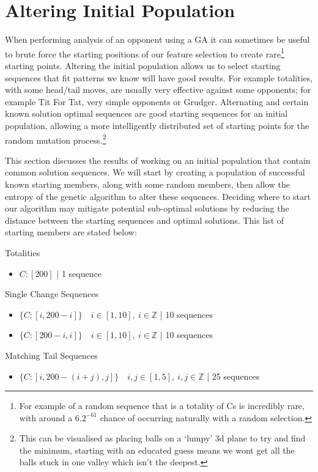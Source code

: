\section{Altering Initial Population}\label{sec:alteringinitialpopulation}
When performing analysis of an opponent using a GA it can sometimes be useful to brute force the starting positions of our feature selection to create rare\footnote{For example of a random sequence that is a totality of Cs is incredibly rare, with around a \(6.2^{-61}\) chance of occurring naturally with a random selection.} starting points.
Altering the initial population allows us to select starting sequences that fit patterns we know will have good results.
For example totalities, with some head/tail moves, are usually very effective against some opponents;
for example Tit For Tat, very simple opponents or Grudger.
Alternating and certain known solution optimal sequences are good starting sequences for an initial population, allowing a more intelligently distributed set of starting points for the random mutation process.\footnote{This can be visualised as placing balls on a `lumpy' 3d plane to try and find the minimum, starting with an educated guess means we wont get all the balls stuck in one valley which isn't the deepest.}

This section discusses the results of working on an initial population that contain common solution sequences.
We will start by creating a population of successful known starting members, along with some random members, then allow the entropy of the genetic algorithm to alter these sequences.
Deciding where to start our algorithm may mitigate potential sub-optimal solutions by reducing the distance between the starting sequences and optimal solutions.
This list of starting members are stated below:

Totalities
\begin{itemize}
    \item \(C:[200]\) | 1 sequence
\end{itemize}

Single Change Sequences
\begin{itemize}
    \item \(\{C:[i,200-i]\} \quad i\in [1,10],\ i \in \mathbb{Z}\) | 10 sequences
    \item \(\{C:[200-i,i]\} \quad i\in [1,10],\ i \in \mathbb{Z}\) | 10 sequences
\end{itemize}

Matching Tail Sequences
\begin{itemize}
    \item \(\{C:[i,200-(i+j),j]\} \quad i,j \in [1,5],\ i,j \in \mathbb{Z}\) | 25 sequences
\end{itemize}

